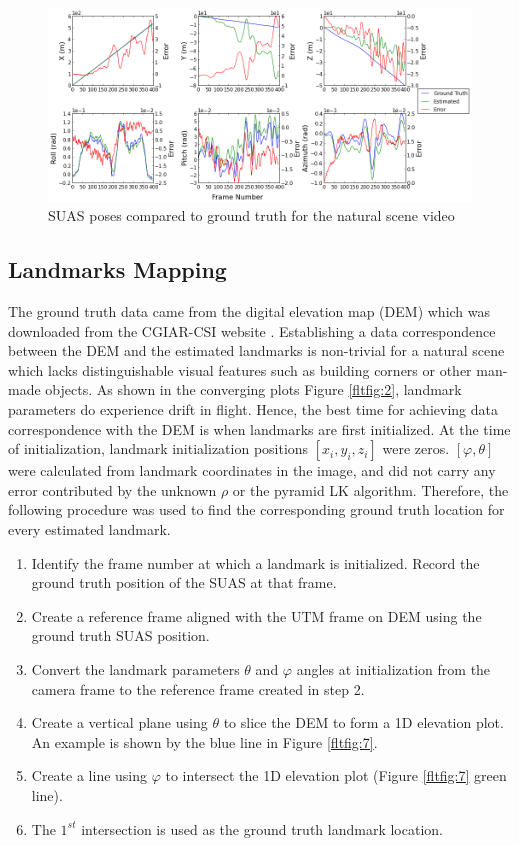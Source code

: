 \begin{figure}[h]
\centering
\includegraphics[width=15.5cm, keepaspectratio=true]
{./Figures/fltfig/cut1/Figure30.png}
\caption{SUAS poses compared to ground truth for the natural scene video}
\label{fltfig:6}
\end{figure}
\FloatBarrier

\subsection{Landmarks Mapping}\label{sec:accuracy_features}

The ground truth data came from the digital elevation map (DEM) which
was downloaded from the CGIAR-CSI website \cite{_cgiar-csi_????}.
Establishing a data correspondence between the DEM and the estimated
landmarks is non-trivial for a natural scene which lacks
distinguishable visual features such as building corners or other
man-made objects. As shown in the converging plots Figure
\ref{fltfig:2}, landmark parameters do experience drift in flight.
Hence, the best time for achieving data correspondence with the DEM is
when landmarks are first initialized. At the time of initialization,
landmark initialization positions $[x_i, y_i, z_i]$ were zeros.
$[\varphi, \theta]$ were calculated from landmark coordinates in the
image, and did not carry any error contributed by the unknown $\rho$
or the pyramid LK algorithm. Therefore, the following procedure was
used to find the corresponding ground truth location for every
estimated landmark.

\begin{enumerate}
  \item Identify the frame number at which a landmark is initialized.
  Record the ground truth position of the SUAS at that frame.
  \item Create a reference frame aligned with the UTM frame on DEM
  using the ground truth SUAS position.
  \item Convert the landmark parameters $\theta$ and $\varphi$
  angles at initialization from the camera frame to the reference frame created in step 2. 
  \item Create a vertical plane using $\theta$ to slice the DEM to
  form a 1D elevation plot. An example is shown by the blue line in Figure
  \ref{fltfig:7}.
  \item Create a line using $\varphi$ to intersect the 1D elevation plot
  (Figure \ref{fltfig:7} green line). 
  \item The $1^{st}$ intersection is used as the ground truth landmark
  location.
\end{enumerate}

